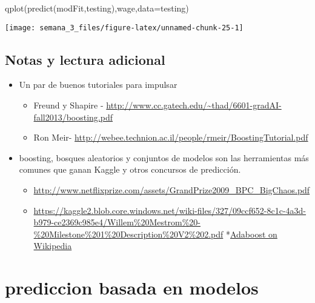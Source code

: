 \documentclass[
]{article}
\newenvironment{Shaded}{\begin{snugshade}}{\end{snugshade}}
\newcommand{\AttributeTok}[1]{\textcolor[rgb]{0.77,0.63,0.00}{#1}}
\newcommand{\FunctionTok}[1]{\textcolor[rgb]{0.00,0.00,0.00}{#1}}
\newcommand{\NormalTok}[1]{#1}
\providecommand{\tightlist}{%
  \setlength{\itemsep}{0pt}\setlength{\parskip}{0pt}}
\begin{document}
\begin{Shaded}
\begin{Highlighting}[]
\FunctionTok{qplot}\NormalTok{(}\FunctionTok{predict}\NormalTok{(modFit,testing),wage,}\AttributeTok{data=}\NormalTok{testing)}
\end{Highlighting}
\end{Shaded}

\begin{center}\texttt{[image: semana\_3\_files/figure-latex/unnamed-chunk-25-1]} \end{center}

\hypertarget{notas-y-lectura-adicional}{%
\subsection{Notas y lectura adicional}\label{notas-y-lectura-adicional}}

\begin{itemize}
\tightlist
\item
  Un par de buenos tutoriales para impulsar

  \begin{itemize}
  \tightlist
  \item
    Freund y Shapire -
    \href{http://www.cc.gatech.edu/~thad/6601-gradAI\%20-fall2013\%20/\%20boosting.pdf}{http://www.cc.gatech.edu/\textasciitilde thad/6601-gradAI-fall2013/boosting.pdf}
  \item
    Ron Meir-
    \url{http://webee.technion.ac.il/people/rmeir/BoostingTutorial.pdf}
  \end{itemize}
\item
  boosting, bosques aleatorios y conjuntos de modelos son las
  herramientas más comunes que ganan Kaggle y otros concursos de
  predicción.

  \begin{itemize}
  \tightlist
  \item
    \url{http://www.netflixprize.com/assets/GrandPrize2009_BPC_BigChaos.pdf}
  \item
    \url{https://kaggle2.blob.core.windows.net/wiki-files/327/09ccf652-8c1c-4a3d-b979-ce2369c985e4/Willem\%20Mestrom\%20-\%20Milestone\%201\%20Description\%20V2\%202.pdf}
    *\href{http://en.wikipedia.org/wiki/AdaBoost}{Adaboost on Wikipedia}
  \end{itemize}
\end{itemize}

\hypertarget{prediccion-basada-en-modelos}{%
\section{prediccion basada en
modelos}\label{prediccion-basada-en-modelos}}
\end{document}
